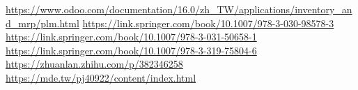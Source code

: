 \newpage
\renewcommand\bibname{參~考~文~獻}
\begin{thebibliography}{99}  %

 \url{https://www.odoo.com/documentation/16.0/zh_TW/applications/inventory_and_mrp/plm.html}
 \url{https://link.springer.com/book/10.1007/978-3-030-98578-3}
 \url{https://link.springer.com/book/10.1007/978-3-031-50658-1}
 \url{https://link.springer.com/book/10.1007/978-3-319-75804-6}
 \url{https://zhuanlan.zhihu.com/p/382346258}
 \url{https://mde.tw/pj40922/content/index.html}

\end{thebibliography}
\newpage
